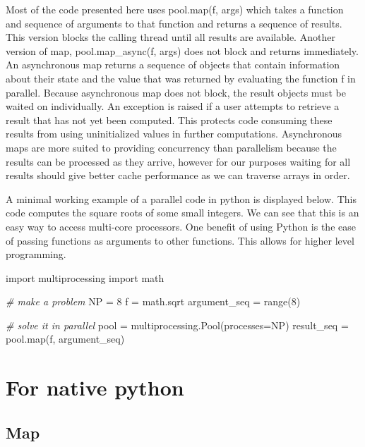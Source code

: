 \documentclass[]{IEEEtran}
\newenvironment{Shaded}{}{}
\newcommand{\DataTypeTok}[1]{\textcolor[rgb]{0.56,0.13,0.00}{{#1}}}
\newcommand{\DecValTok}[1]{\textcolor[rgb]{0.25,0.63,0.44}{{#1}}}
\newcommand{\CharTok}[1]{\textcolor[rgb]{0.25,0.44,0.63}{{#1}}}
\newcommand{\CommentTok}[1]{\textcolor[rgb]{0.38,0.63,0.69}{\textit{{#1}}}}
\newcommand{\NormalTok}[1]{{#1}}
\begin{document}
Most of the code presented here uses pool.map(f, args) which takes a
function and sequence of arguments to that function and returns a
sequence of results. This version blocks the calling thread until all
results are available. Another version of map, pool.map\_async(f, args)
does not block and returns immediately. An asynchronous map returns a
sequence of objects that contain information about their state and the
value that was returned by evaluating the function f in parallel.
Because asynchronous map does not block, the result objects must be
waited on individually. An exception is raised if a user attempts to
retrieve a result that has not yet been computed. This protects code
consuming these results from using uninitialized values in further
computations. Asynchronous maps are more suited to providing concurrency
than parallelism because the results can be processed as they arrive,
however for our purposes waiting for all results should give better
cache performance as we can traverse arrays in order.

A minimal working example of a parallel code in python is displayed
below. This code computes the square roots of some small integers. We
can see that this is an easy way to access multi-core processors. One
benefit of using Python is the ease of passing functions as arguments to
other functions. This allows for higher level programming.

\begin{Shaded}
\begin{Highlighting}[numbers=left,,]
\CharTok{import} \NormalTok{multiprocessing}
\CharTok{import} \NormalTok{math}

\CommentTok{# make a problem}
\NormalTok{NP = }\DecValTok{8}
\NormalTok{f = math.sqrt}
\NormalTok{argument_seq = }\DataTypeTok{range}\NormalTok{(}\DecValTok{8}\NormalTok{)}

\CommentTok{# solve it in parallel}
\NormalTok{pool = multiprocessing.Pool(processes=NP)}
\NormalTok{result_seq = pool.}\DataTypeTok{map}\NormalTok{(f, argument_seq)}
\end{Highlighting}
\end{Shaded}
\section{For native python}

\subsection{Map}
\end{document}
